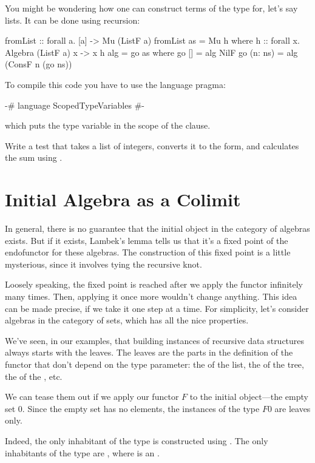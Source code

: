 \documentclass[DaoFP]{subfiles}
\begin{document}
You might be wondering how one can construct terms of the type  for, let's say lists. It can be done using recursion:
\begin{haskell}
fromList :: forall a. [a] -> Mu (ListF a)
fromList as = Mu h
  where h :: forall x. Algebra (ListF a) x -> x
        h alg = go as
          where
            go [] = alg NilF
            go (n: ns) = alg (ConsF n (go ns))
\end{haskell}
To compile this code you have to use the language pragma:
\begin{haskell}
{-# language ScopedTypeVariables #-}
\end{haskell}
which puts the type variable  in the scope of the  clause.

\begin{exercise}
Write a test that takes a list of integers, converts it to the  form, and calculates the sum using .
\end{exercise}


\section{Initial Algebra as a Colimit}

In general, there is no guarantee that the initial object in the category of algebras exists. But if it exists, Lambek's lemma tells us that it's a fixed point of the endofunctor for these algebras.  The construction of this fixed point is a little mysterious, since it involves tying the recursive knot. 

Loosely speaking, the fixed point is reached after we apply the functor infinitely many times. Then, applying it once more wouldn't change anything. This idea can be made precise, if we take it one step at a time. For simplicity, let's consider algebras in the category of sets, which has all the nice properties.

We've seen, in our examples, that building instances of recursive data structures always starts with the leaves. The leaves are the parts in the definition of the functor that don't depend on the type parameter: the  of the list, the  of the tree, the  of the , etc. 

We can tease them out if we apply our functor $F$ to the initial object---the empty set $0$. Since the empty set has no elements, the instances of the type $F 0$ are leaves only. 

Indeed, the only inhabitant of the type  is constructed using . The only inhabitants of the type  are , where  is an .
\end{document}
